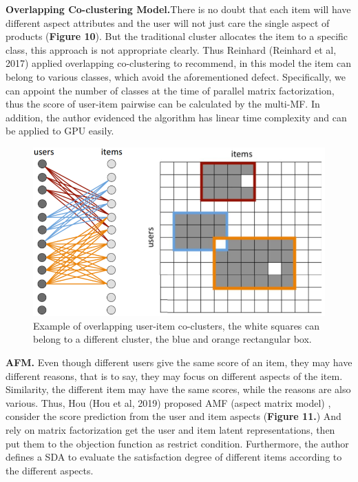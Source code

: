 \documentclass[10pt,twocolumn,letterpaper]{article}
\begin{document}
{\bf Overlapping Co-clustering Model.}There is no doubt that each item will have different aspect attributes and the user will not just care the single aspect of products ({\bf Figure 10}). But the traditional cluster allocates the item to a specific class, this approach is not appropriate clearly. Thus Reinhard (Reinhard et al, 2017) applied overlapping co-clustering to recommend, in this model the item can belong to various classes, which avoid the aforementioned defect. Specifically, we can appoint the number of classes at the time of parallel matrix factorization, thus the score of user-item pairwise can be calculated by the multi-MF. In addition, the author evidenced the algorithm has linear time complexity and can be applied to GPU easily.  
\begin{figure}
	\begin{center}
		\includegraphics[width=0.8\linewidth]{co_cluster.png}
	\end{center}
	\caption{Example of overlapping user-item co-clusters, the white squares can belong to a different cluster, the blue and orange rectangular box.}
	\label{fig:long}
	\label{fig:onecol}
\end{figure}

{\bf AFM.} Even though different users give the same score of an item, they may have different reasons, that is to say, they may focus on different aspects of the item. Similarity, the different item may have the same scores, while the reasons are also various. Thus, Hou (Hou et al, 2019) proposed AMF (aspect matrix model) , consider the score prediction from the user and item aspects ({\bf Figure 11.}) And rely on matrix factorization get the user and item latent representations, then put them to the objection function as restrict condition. Furthermore, the author defines a SDA to evaluate the satisfaction degree of different items according to the different aspects. 
\end{document}
